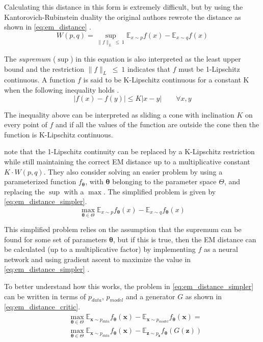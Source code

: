 Calculating this distance in this form is extremely difficult, but by using the Kantorovich-Rubinstein duality the original authors rewrote the distance as shown in \autoref{eq:em_distance} \cite{wasserstein2017}.
\begin{equation} \label{eq:em_distance}
    W(p, q) = \sup_{\|f\|_{L} \: \leq \: 1}{
        \mathbb{E}_{x\sim p}f(x) - \mathbb{E}_{x\sim q}f(x)
    }
\end{equation}

The \textit{supremum} ($\sup$) in this equation is also interpreted as the least upper bound and the restriction $\|f\|_{L} \: \leq \: 1$ indicates that $f$ must be 1-Lipschitz continuous. A function $f$ is said to be K-Lipschitz continuous for a constant K when the following inequality holds \cite{lipschitz20XX}.
\begin{equation}
    | f(x) - f(y) | \leq K | x - y |  \qquad \forall x,y
\end{equation}

The inequality above can be interpreted as sliding a cone with inclination $K$ on every point of $f$ and if all the values of the function are outside the cone then the function is K-Lipschitz continuous.

\textcite{wasserstein2017} note that the 1-Lipschitz continuity can be replaced by a K-Lipschitz restriction while still maintaining the correct EM distance up to a multiplicative constant $K \cdot W(p,q)$. They also consider solving an easier problem by using a parameterized function $f_{\bm{\theta}}$, with $\bm{\theta}$ belonging to the parameter space $\Theta$, and replacing the $\sup$ with a $\max$. The simplified problem is given by \autoref{eq:em_distance_simpler}.
\begin{equation} \label{eq:em_distance_simpler}
    \max_{\bm{\theta} \in \Theta} {
        \mathbb{E}_{x\sim p}f_{\bm{\theta}}(x) - \mathbb{E}_{x\sim q}f_{\bm{\theta}}(x)
    }
\end{equation}

This simplified problem relies on the assumption that the supremum can be found for some set of parameters $\bm{\theta}$, but if this is true, then the \gls{EM} distance can be calculated (up to a multiplicative factor) by implementing $f$ as a neural network and using gradient ascent to maximize the value in \autoref{eq:em_distance_simpler} \cite{wasserstein2017}.

To better understand how this works, the problem in \autoref{eq:em_distance_simpler} can be written in terms of $p_{data}$, $p_{model}$ and a generator $G$ as shown in \autoref{eq:em_distance_critic}.
\begin{align} \label{eq:em_distance_critic}
    & \max_{\bm{\theta} \in \Theta} {
        \mathbb{E}_{\bm{x}\sim p_{data}}f_{\bm{\theta}}(\bm{x}) -
        \mathbb{E}_{\bm{x}\sim p_{model}}f_{\bm{\theta}}(\bm{x})
    } = \nonumber \\[10pt]
    & \max_{\bm{\theta} \in \Theta} {
        \mathbb{E}_{\bm{x}\sim p_{data}}f_{\bm{\theta}}(\bm{x}) -
        \mathbb{E}_{\bm{z}\sim p_{\bm{z}}}f_{\bm{\theta}}(G(\bm{z}))
    }
\end{align}

